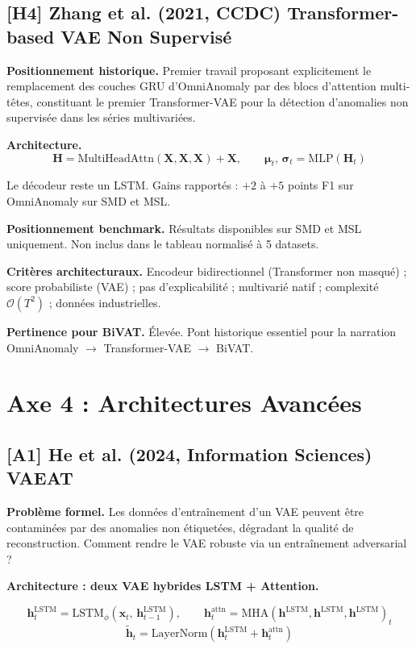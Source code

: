 \documentclass[12pt,a4paper]{article}
\begin{document}
\subsection{[H4] Zhang et al. (2021, CCDC) 
Transformer-based VAE Non Supervisé}

\textbf{Positionnement historique.} Premier travail proposant explicitement le
remplacement des couches GRU d'OmniAnomaly par des blocs d'attention multi-têtes,
constituant le premier Transformer-VAE pour la détection d'anomalies non
supervisée dans les séries multivariées.

\textbf{Architecture.}
$$\mathbf{H} = \mathrm{MultiHeadAttn}(\mathbf{X}, \mathbf{X}, \mathbf{X})
+ \mathbf{X}, \qquad
\boldsymbol{\mu}_t,\,\boldsymbol{\sigma}_t = \mathrm{MLP}(\mathbf{H}_t)$$

Le décodeur reste un LSTM. Gains rapportés : $+2$ à $+5$ points F1 sur
OmniAnomaly sur SMD et MSL.

\textbf{Positionnement benchmark.} Résultats disponibles sur SMD et MSL
uniquement. Non inclus dans le tableau normalisé à 5 datasets.

\textbf{Critères architecturaux.} Encodeur bidirectionnel (Transformer non
masqué) ; score probabiliste (VAE) ; pas d'explicabilité ; multivarié natif ;
complexité $\mathcal{O}(T^2)$ ; données industrielles.

\textbf{Pertinence pour BiVAT.} Élevée. Pont historique essentiel pour la
narration OmniAnomaly $\rightarrow$ Transformer-VAE $\rightarrow$ BiVAT.

\section{Axe 4 : Architectures Avancées}

\subsection{[A1] He et al. (2024, Information Sciences)  VAEAT}

\textbf{Problème formel.} Les données d'entraînement d'un VAE peuvent être
contaminées par des anomalies non étiquetées, dégradant la qualité de
reconstruction. Comment rendre le VAE robuste via un entraînement adversarial ?

\textbf{Architecture : deux VAE hybrides LSTM + Attention.}

$$\mathbf{h}^{\mathrm{LSTM}}_t =
\mathrm{LSTM}_\phi(\mathbf{x}_t,\,\mathbf{h}^{\mathrm{LSTM}}_{t-1}), \qquad
\mathbf{h}^{\mathrm{attn}}_t =
\mathrm{MHA}(\mathbf{h}^{\mathrm{LSTM}},
\mathbf{h}^{\mathrm{LSTM}},\mathbf{h}^{\mathrm{LSTM}})_t$$
$$\tilde{\mathbf{h}}_t = \mathrm{LayerNorm}(\mathbf{h}^{\mathrm{LSTM}}_t
+ \mathbf{h}^{\mathrm{attn}}_t)$$
\end{document}
